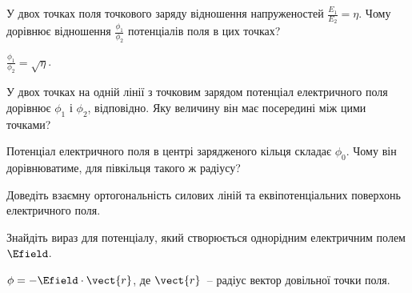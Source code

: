 %

\begin{problem}
    У двох точках поля точкового заряду відношення напруженостей $\frac{E_1}{E_2} = \eta$. Чому дорівнює відношення $\frac{\phi_1}{\phi_2}$ потенціалів поля в цих точках?
\begin{solution}
	$\frac{\phi_1}{\phi_2} =\sqrt\eta$.
\end{solution}
\end{problem}

\begin{problem}
    У двох точках на одній лінії з точковим зарядом потенціал електричного поля дорівнює $\phi_1$ і $\phi_2$, відповідно. Яку величину він має посередині між цими точками?

\end{problem}

\begin{problem}
    Потенціал електричного поля в центрі зарядженого кільця складає $\phi_0$. Чому він дорівнюватиме, для півкільця такого ж радіусу?
\end{problem}

\begin{problem}
    Доведіть взаємну ортогональність силових ліній та еквіпотенціальних поверхонь електричного поля.
\end{problem}


\begin{problem}
    Знайдіть вираз для потенціалу, який створюється однорідним електричним полем $\Efield$.
\begin{solution}
	$\phi = -\Efield\cdot\vect{r}$, де $\vect{r}$~-- радіус вектор довільної точки поля.
\end{solution}
\end{problem}

